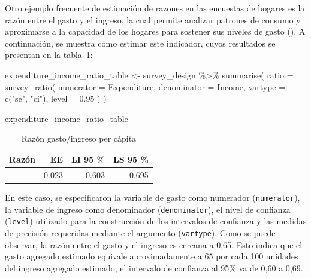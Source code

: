\documentclass[
  spanish,
  11pt,
  letterpaper,
  oneside,
  open=any]{scrbook}
\newenvironment{Shaded}{\begin{snugshade}}{\end{snugshade}}
\newcommand{\AttributeTok}[1]{\textcolor[rgb]{0.40,0.45,0.13}{#1}}
\newcommand{\FloatTok}[1]{\textcolor[rgb]{0.68,0.00,0.00}{#1}}
\newcommand{\FunctionTok}[1]{\textcolor[rgb]{0.28,0.35,0.67}{#1}}
\newcommand{\NormalTok}[1]{\textcolor[rgb]{0.00,0.23,0.31}{#1}}
\newcommand{\OtherTok}[1]{\textcolor[rgb]{0.00,0.23,0.31}{#1}}
\newcommand{\SpecialCharTok}[1]{\textcolor[rgb]{0.37,0.37,0.37}{#1}}
\newcommand{\StringTok}[1]{\textcolor[rgb]{0.13,0.47,0.30}{#1}}
\begin{document}
Otro ejemplo frecuente de estimación de razones en las encuestas de
hogares es la razón entre el gasto y el ingreso, la cual permite
analizar patrones de consumo y aproximarse a la capacidad de los hogares
para sostener sus niveles de gasto (). A continuación, se muestra cómo estimar este indicador, cuyos
resultados se presentan en la tabla~\ref{tbl-razon-gasto-ingreso}:

\begin{Shaded}
\begin{Highlighting}[]
\NormalTok{expenditure\_income\_ratio\_table }\OtherTok{\textless{}{-}}\NormalTok{ survey\_design }\SpecialCharTok{\%\textgreater{}\%}
  \FunctionTok{summarise}\NormalTok{(}
    \AttributeTok{ratio =} \FunctionTok{survey\_ratio}\NormalTok{(}
      \AttributeTok{numerator =}\NormalTok{ Expenditure,}
      \AttributeTok{denominator =}\NormalTok{ Income,}
      \AttributeTok{vartype =} \FunctionTok{c}\NormalTok{(}\StringTok{"se"}\NormalTok{, }\StringTok{"ci"}\NormalTok{),}
      \AttributeTok{level =} \FloatTok{0.95}
\NormalTok{    )}
\NormalTok{  )}

\NormalTok{expenditure\_income\_ratio\_table}
\end{Highlighting}
\end{Shaded}

{

\begin{longtable}[]{@{}rrrr@{}}

\caption{\label{tbl-razon-gasto-ingreso}Razón gasto/ingreso per cápita}

\tabularnewline

\toprule\noalign{}
Razón & EE & LI 95 \% & LS 95 \% \\
\midrule\noalign{}
\endhead
\bottomrule\noalign{}
\endlastfoot
0.649 & 0.023 & 0.603 & 0.695 \\

\end{longtable}

}

En este caso, se especificaron la variable de gasto como numerador
(\texttt{numerator}), la variable de ingreso como denominador
(\texttt{denominator}), el nivel de confianza (\texttt{level}) utilizado
para la construcción de los intervalos de confianza y las medidas de
precisión requeridas mediante el argumento (\texttt{vartype}). Como se
puede observar, la razón entre el gasto y el ingreso es cercana a 0,65.
Esto indica que el gasto agregado estimado equivale aproximadamente a 65
por cada 100 unidades del ingreso agregado estimado; el intervalo de
confianza al 95\% va de 0,60 a 0,69.
\end{document}
